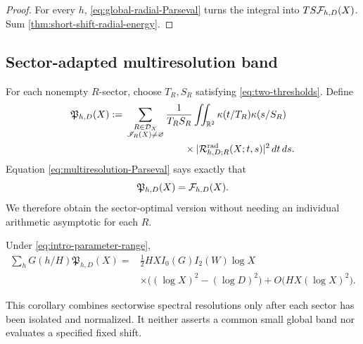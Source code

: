 \begin{proof}
For every $h$, \eqref{eq:global-radial-Parseval} turns the integral into
$TS\mathcal F_{h,D}(X)$.  Sum \cref{thm:short-shift-radial-energy}.
\end{proof}

\subsection{Sector-adapted multiresolution band}

For each nonempty $R$-sector, choose $T_R,S_R$ satisfying
\eqref{eq:two-thresholds}.  Define
\begin{equation}
 \begin{aligned}
 \mathfrak P_{h,D}(X)
 :={}&\sum_{\substack{R\in\mathcal D_X\\\mathscr I_R(X)\ne\varnothing}}
 \frac1{T_RS_R}
 \iint_{\mathbb R^2}\kappa(t/T_R)\kappa(s/S_R)\\
 &\hspace{6em}\times
 |\mathcal R^{\mathrm{rad}}_{h,D;R}(X;t,s)|^2\,dt\,ds.
 \end{aligned}
 \label{eq:multiresolution-functional}
\end{equation}
Equation \eqref{eq:multiresolution-Parseval} says exactly that
\begin{equation}
 \mathfrak P_{h,D}(X)=\mathcal F_{h,D}(X).
 \label{eq:multiresolution-equals-energy}
\end{equation}
We therefore obtain the sector-optimal version without needing an
individual arithmetic asymptotic for each $R$.

\begin{corollary}
\label{cor:short-shift-multiresolution}
Under \eqref{eq:intro-parameter-range},
\begin{equation}
 \begin{aligned}
 \sum_hG(h/H)\mathfrak P_{h,D}(X)
 ={}&\frac12HX I_0(G)I_2(W)\log X\\
 &\times\bigl((\log X)^2-(\log D)^2\bigr)
 +O\bigl(HX(\log X)^2\bigr).
 \end{aligned}
 \label{eq:short-shift-multiresolution}
\end{equation}
\end{corollary}

This corollary combines sectorwise spectral resolutions only after each
sector has been isolated and normalized.  It neither asserts a common
small global band nor evaluates a specified fixed shift.
